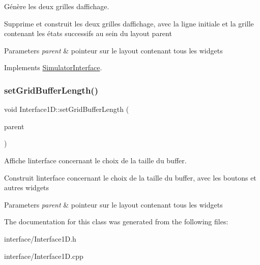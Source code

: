 Génère les deux grilles d\textquotesingle{}affichage. 

Supprime et construit les deux grilles d\textquotesingle{}affichage, avec la ligne initiale et la grille contenant les états successifs au sein du layout parent 
\begin{DoxyParams}{Parameters}
{\em parent} & pointeur sur le layout contenant tous les widgets \\
\hline
\end{DoxyParams}


Implements \mbox{\hyperlink{class_simulator_interface}{Simulator\+Interface}}.

\mbox{\label{class_interface1_d_ac4e37f73f171f053a9eccb9c6cc60481}} 
\subsubsection{\texorpdfstring{set\+Grid\+Buffer\+Length()}{setGridBufferLength()}}
{\footnotesize\ttfamily void Interface1\+D\+::set\+Grid\+Buffer\+Length (\begin{DoxyParamCaption}\item[{Q\+Box\+Layout $\ast$}]{parent }\end{DoxyParamCaption})\hspace{0.3cm}{\ttfamily [protected]}}



Affiche l\textquotesingle{}interface concernant le choix de la taille du buffer. 

Construit l\textquotesingle{}interface concernant le choix de la taille du buffer, avec les boutons et autres widgets 
\begin{DoxyParams}{Parameters}
{\em parent} & pointeur sur le layout contenant tous les widgets \\
\hline
\end{DoxyParams}


The documentation for this class was generated from the following files\+:\begin{DoxyCompactItemize}
\item 
interface/Interface1\+D.\+h\item 
interface/Interface1\+D.\+cpp\end{DoxyCompactItemize}
